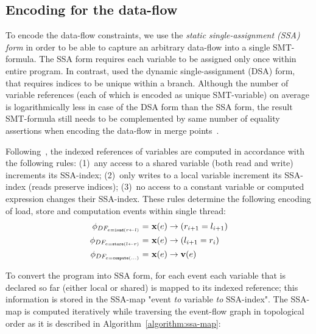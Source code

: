 \subsection{Encoding for the data-flow}
\label{ch:port:enc:df}

To encode the data-flow constraints, we use the \textit{static single-assignment (SSA) form} in order to be able to capture an arbitrary data-flow into a single SMT-formula.
The SSA form requires each variable to be assigned only once within entire program.
In contrast, \Porthos used the dynamic single-assignment (DSA) form, that requires indices to be unique within a branch.
Although the number of variable references (each of which is encoded as unique SMT-variable) on average is logarithmically less in case of the DSA form than the SSA form, the result SMT-formula still needs to be complemented by same number of equality assertions when encoding the data-flow in merge points~\cite{Porthos17}.

Following~\cite{Porthos17}, the indexed references of variables are computed in accordance with the following rules:
(1)~any access to a shared variable (both read and write) increments its SSA-index;
(2)~only writes to a local variable increment its SSA-index (reads preserve indices);
(3)~no access to a constant variable or computed expression changes their SSA-index.
These rules determine the following encoding of load, store and computation events within single thread:
\begin{align}
    \phi_{DF_{e = \mathtt{load}(r \leftarrow l)}} = \ & \fx(e) \rightarrow (r_{i+1} = l_{i+1}) \\
    \phi_{DF_{e = \mathtt{store}(l \leftarrow r)}} = \ & \fx(e) \rightarrow (l_{i+1} = r_i) \\
    \phi_{DF_{e = \mathtt{compute}(...)}} = \ & \fx(e) \rightarrow \fv(e) %
\end{align}

To convert the program into SSA form, for each event each variable that is declared so far (either local or shared) is mapped to its indexed reference; this information is stored in the SSA-map "event \textit{to} variable \textit{to} SSA-index". %
The SSA-map is computed iteratively while traversing the event-flow graph in topological order as it is described in Algorithm~\ref{algorithm:ssa-map}:

